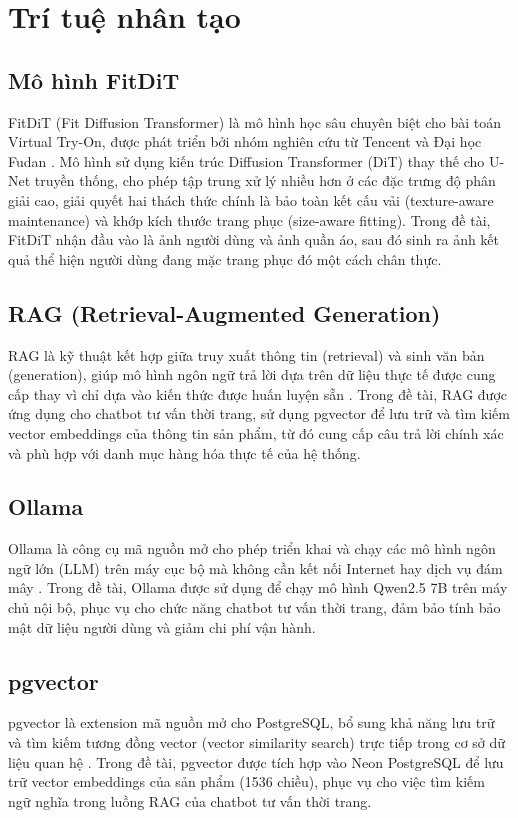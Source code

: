 \section{Trí tuệ nhân tạo}

\subsection{Mô hình FitDiT}
FitDiT (Fit Diffusion Transformer) là mô hình học sâu chuyên biệt 
cho bài toán Virtual Try-On, được phát triển bởi nhóm nghiên cứu 
từ Tencent và Đại học Fudan \cite{fitdit_paper}. Mô hình sử dụng 
kiến trúc Diffusion Transformer (DiT) thay thế cho U-Net truyền 
thống, cho phép tập trung xử lý nhiều hơn ở các đặc trưng độ 
phân giải cao, giải quyết hai thách thức chính là bảo toàn kết 
cấu vải (texture-aware maintenance) và khớp kích thước trang phục 
(size-aware fitting). Trong đề tài, FitDiT nhận đầu vào là ảnh 
người dùng và ảnh quần áo, sau đó sinh ra ảnh kết quả thể hiện 
người dùng đang mặc trang phục đó một cách chân thực.

\subsection{RAG (Retrieval-Augmented Generation)}
RAG là kỹ thuật kết hợp giữa truy xuất thông tin (retrieval) và 
sinh văn bản (generation), giúp mô hình ngôn ngữ trả lời dựa trên 
dữ liệu thực tế được cung cấp thay vì chỉ dựa vào kiến thức được 
huấn luyện sẵn \cite{rag_lewis_2020}. Trong đề tài, RAG được ứng 
dụng cho chatbot tư vấn thời trang, sử dụng pgvector để lưu trữ 
và tìm kiếm vector embeddings của thông tin sản phẩm, từ đó cung 
cấp câu trả lời chính xác và phù hợp với danh mục hàng hóa thực 
tế của hệ thống.

\subsection{Ollama}
Ollama là công cụ mã nguồn mở cho phép triển khai và chạy các 
mô hình ngôn ngữ lớn (LLM) trên máy cục bộ mà không cần kết nối 
Internet hay dịch vụ đám mây \cite{ollama_docs}. Trong đề tài, 
Ollama được sử dụng để chạy mô hình Qwen2.5 7B trên máy chủ nội 
bộ, phục vụ cho chức năng chatbot tư vấn thời trang, đảm bảo tính 
bảo mật dữ liệu người dùng và giảm chi phí vận hành.

\subsection{pgvector}
pgvector là extension mã nguồn mở cho PostgreSQL, bổ sung khả năng 
lưu trữ và tìm kiếm tương đồng vector (vector similarity search) 
trực tiếp trong cơ sở dữ liệu quan hệ \cite{pgvector_github}. 
Trong đề tài, pgvector được tích hợp vào Neon PostgreSQL để lưu 
trữ vector embeddings của sản phẩm (1536 chiều), phục vụ cho 
việc tìm kiếm ngữ nghĩa trong luồng RAG của chatbot tư vấn 
thời trang.